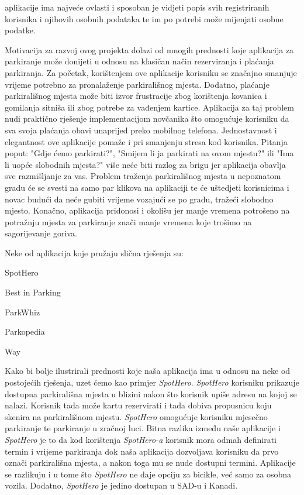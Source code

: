 		
		 aplikacije ima najveće ovlasti i sposoban je vidjeti popis svih registriranih korisnika i njihovih osobnih podataka te im po potrebi može mijenjati osobne podatke.
		
		Motivacija za razvoj ovog projekta dolazi od mnogih prednosti koje aplikacija za parkiranje može donijeti u odnosu na klasičan način rezerviranja i plaćanja parkiranja. Za početak, korištenjem ove aplikacije korisniku se značajno smanjuje vrijeme potrebno za pronalaženje parkirališnog mjesta. Dodatno, plaćanje parkirališnog mjesta može biti izvor frustracije zbog korištenja kovanica i gomilanja sitniša ili zbog potrebe za vađenjem kartice. Aplikacija za taj problem nudi praktično rješenje implementacijom novčanika što omogućuje korisniku da sva svoja plaćanja obavi unaprijed preko mobilnog telefona. Jednostavnost i elegantnost ove aplikacije pomaže i pri smanjenju stresa kod korisnika. Pitanja poput: "Gdje ćemo parkirati?", "Smijem li ja parkirati na ovom mjestu?" ili "Ima li uopće slobodnih mjesta?" više neće biti razlog za brigu jer aplikacija obavlja sve razmišljanje za vas. Problem traženja parkirališnog mjesta u nepoznatom gradu će se svesti na samo par klikova na aplikaciji te će uštedjeti korisnicima i novac budući da neće gubiti vrijeme vozajući se po gradu, tražeći slobodno mjesto. Konačno, aplikacija pridonosi i okolišu jer manje vremena potrošeno na potražnju mjesta za parkiranje znači manje vremena koje trošimo na sagorijevanje goriva.
		
		Neke od aplikacija koje pružaju slična rješenja su:
		\begin{packed_item}
			\item SpotHero
			\item Best in Parking
			\item ParkWhiz
			\item Parkopedia
			\item Way
		\end{packed_item}
		
		Kako bi bolje ilustrirali prednosti koje naša aplikacija ima u odnosu na neke od postojećih rješenja, uzet ćemo kao primjer \textit {SpotHero}. \textit {SpotHero} korisniku prikazuje dostupna parkirališna mjesta u blizini nakon što korisnik upiše adresu na kojoj se nalazi. Korisnik tada može kartu rezervirati i tada dobiva propusnicu koju skenira na parkirališnom mjestu. \textit {SpotHero} omogućuje korisniku mjesečno parkiranje te parkiranje u zračnoj luci. Bitna razlika između naše aplikacije i \textit {SpotHero} je to da kod korištenja \textit {SpotHero-a} korisnik mora odmah definirati termin i vrijeme parkiranja dok naša aplikacija dozvoljava korisniku da prvo označi parkirališna mjesta, a nakon toga mu se nude dostupni termini. Aplikacije se razlikuju i u tome što \textit {SpotHero} ne daje opciju za bicikle, već samo za osobna vozila. Dodatno, \textit {SpotHero} je jedino dostupan u SAD-u i Kanadi.
		
